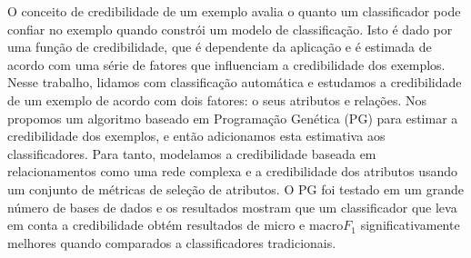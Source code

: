 
O conceito de credibilidade de um exemplo avalia o quanto um classificador pode confiar no exemplo quando constrói um modelo de classificação.
Isto é dado por uma função de credibilidade, que é dependente da aplicação e é estimada de acordo com uma série de fatores que influenciam a credibilidade dos exemplos.
Nesse trabalho, lidamos com classificação automática e estudamos a credibilidade de um exemplo de acordo com dois fatores: o seus atributos e relações.
Nos propomos um algoritmo baseado em Programação Genética (PG) para estimar a credibilidade dos exemplos, e então adicionamos esta estimativa aos classificadores.
Para tanto, modelamos a credibilidade baseada em relacionamentos como uma rede complexa e a credibilidade dos atributos usando um conjunto de métricas de seleção de atributos.
O PG foi testado em um grande número de bases de dados e os resultados mostram que um classificador que leva em conta a credibilidade obtém resultados de micro e macro$F_1$ significativamente melhores quando comparados a classificadores tradicionais.

